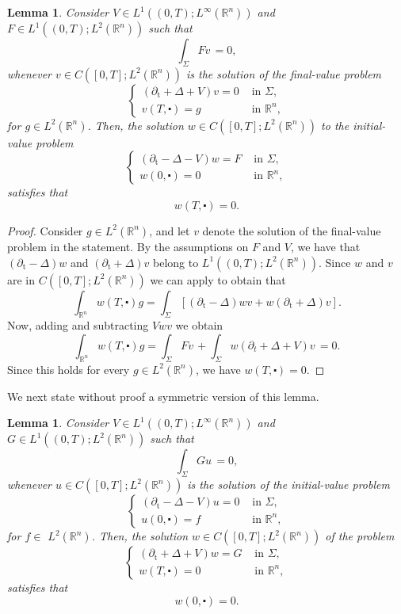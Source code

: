 \documentclass[10pt,a4paper]{amsart}
\newtheorem{lemma}[proposition]{Lemma}
\theoremstyle{remark}
\theoremstyle{definition}
\newcommand{\R}{\mathbb{R}}
\newcommand{\tm}{\mathrm{t}}
\begin{document}
\begin{lemma}\label{Zero Trace 1}\sl Consider $V \in L^1 ((0, T) ; L^\infty (\mathbb{R}^{n}))$ and $F \in L^{1}((0, T) ; L^{2}(\mathbb{R}^{n}))$ such that
$$
\int_{\Sigma} Fv \,=0,
$$
whenever $v \in C([0, T] ; L^{2}(\mathbb{R}^{n}))$ is the solution of the final-value problem
$$
\begin{cases} (\partial_{\tm}+\Delta+V)v=0 & \text { in } \Sigma, \\ v(T, \centerdot)=g & \text { in } \mathbb{R}^{n},\end{cases}
$$
for $g \in L^{2}(\mathbb{R}^{n})$. Then, the solution $w \in C([0, T] ; L^{2}(\mathbb{R}^{n}))$ to the initial-value problem 
$$
\begin{cases} (\partial_{\tm}-\Delta-V)w=F & \text { in } \Sigma, \\ w(0, \centerdot)=0 & \text { in } \mathbb{R}^{n},\end{cases}
$$
satisfies that
$$
w(T, \centerdot)=0.
$$
\end{lemma}
\begin{proof}
Consider $g \in L^{2}(\mathbb{R}^{n})$, and let $v$ denote the solution of the final-value 
problem in the statement. By the assumptions on $F$ and $V$, we have that
$(\partial_\tm - \Delta)w$ and $(\partial_\tm + \Delta)v$ belong to $L^1((0,T); L^2(\R^n))$.
Since $w$ and $v$ are in $C([0, T] ; L^{2}(\mathbb{R}^{n}))$ we can apply  to
obtain that
$$
 \int_{\mathbb{R}^{n}} w(T, \centerdot) g=\int_{\Sigma}\left[( \partial_{\tm}-\Delta)wv+w( \partial_{\tm}+\Delta) v\right].
$$
Now, adding and subtracting $V wv $ we obtain
$$
\int_{\mathbb{R}^{n}} w(T, \centerdot) g=\int_{\Sigma} F v \, + \int_{\Sigma} w ( \partial_{t}+\Delta+V) v\, =0.
$$
Since this holds for every $ g \in L^{2}(\mathbb{R}^{n})$, we have $w(T, \centerdot)=0$.
\end{proof}

We next state without proof a symmetric version of this lemma.

\begin{lemma}\label{Zero Trace 2}\sl Consider $V \in L^{1}((0, T) ; L^{\infty}(\mathbb{R}^{n}))$ and $G \in L^{1}((0, T) ; L^{2}(\mathbb{R}^{n}))$ such that
$$
\int_{\Sigma} G u\, =0,
$$
whenever $u \in C([0, T] ; L^{2}(\mathbb{R}^{n}))$ is the solution of the initial-value problem
$$
\begin{cases} (\partial_{\tm}-\Delta-V)u=0 & \text { in } \Sigma, \\ u(0, \centerdot)=f & \text { in } \mathbb{R}^{n},\end{cases}
$$
for $f \in$ $L^{2}(\mathbb{R}^{n})$. Then, the solution $w \in C([0, T] ; L^{2}(\mathbb{R}^{n}))$ of the problem
$$
\begin{cases}(\partial_{\tm}+\Delta+V) w=G & \text { in } \Sigma,  \\ w(T, \centerdot)=0 & \text { in } \mathbb{R}^{n},\end{cases}
$$
satisfies that
$$
w(0, \centerdot)=0.
$$
\end{lemma}
\end{document}
